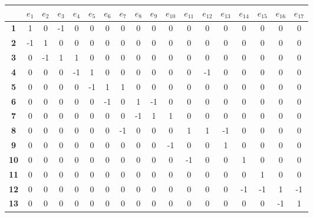 \documentclass[a4paper,12pt]{article}
\begin{document}
\begin{center}
\tiny
\begin{tabular*}{\textwidth}{c|@{\extracolsep{\fill}}ccccccccccccccccc}
\rowcolor[gray]{0.9}
 & \textbf{$e_1$} & \textbf{$e_2$} & \textbf{$e_3$} & \textbf{$e_4$} & \textbf{$e_5$} & \textbf{$e_6$} & \textbf{$e_7$} & \textbf{$e_8$} & \textbf{$e_9$} & \textbf{$e_{10}$} & \textbf{$e_{11}$} & \textbf{$e_{12}$} & \textbf{$e_{13}$} & \textbf{$e_{14}$} & \textbf{$e_{15}$} & \textbf{$e_{16}$} & \textbf{$e_{17}$} \\
\hline
\textbf{1}  &  1 &  0 & -1 &  0 &  0 &  0 &  0 &  0 &  0 &  0 &  0 &  0 &  0 &  0 &  0 &  0 &  0 \\
\textbf{2}  & -1 &  1 &  0 &  0 &  0 &  0 &  0 &  0 &  0 &  0 &  0 &  0 &  0 &  0 &  0 &  0 &  0 \\
\textbf{3}  &  0 & -1 &  1 &  1 &  0 &  0 &  0 &  0 &  0 &  0 &  0 &  0 &  0 &  0 &  0 &  0 &  0 \\
\textbf{4}  &  0 &  0 &  0 & -1 &  1 &  0 &  0 &  0 &  0 &  0 &  0 & -1 &  0 &  0 &  0 &  0 &  0 \\
\textbf{5}  &  0 &  0 &  0 &  0 & -1 &  1 &  1 &  0 &  0 &  0 &  0 &  0 &  0 &  0 &  0 &  0 &  0 \\
\textbf{6}  &  0 &  0 &  0 &  0 &  0 & -1 &  0 &  1 & -1 &  0 &  0 &  0 &  0 &  0 &  0 &  0 &  0 \\
\textbf{7}  &  0 &  0 &  0 &  0 &  0 &  0 &  0 & -1 &  1 &  1 &  0 &  0 &  0 &  0 &  0 &  0 &  0 \\
\textbf{8}  &  0 &  0 &  0 &  0 &  0 &  0 & -1 &  0 &  0 &  0 &  1 &  1 & -1 &  0 &  0 &  0 &  0 \\
\textbf{9}  &  0 &  0 &  0 &  0 &  0 &  0 &  0 &  0 &  0 & -1 &  0 &  0 &  1 &  0 &  0 &  0 &  0 \\
\textbf{10} &  0 &  0 &  0 &  0 &  0 &  0 &  0 &  0 &  0 &  0 & -1 &  0 &  0 &  1 &  0 &  0 &  0 \\
\textbf{11} &  0 &  0 &  0 &  0 &  0 &  0 &  0 &  0 &  0 &  0 &  0 &  0 &  0 &  0 &  1 &  0 &  0 \\
\textbf{12} &  0 &  0 &  0 &  0 &  0 &  0 &  0 &  0 &  0 &  0 &  0 &  0 &  0 & -1 & -1 &  1 & -1 \\
\textbf{13} &  0 &  0 &  0 &  0 &  0 &  0 &  0 &  0 &  0 &  0 &  0 &  0 &  0 &  0 &  0 & -1 &  1 \\
\end{tabular*}
\end{center}

\end{document}
